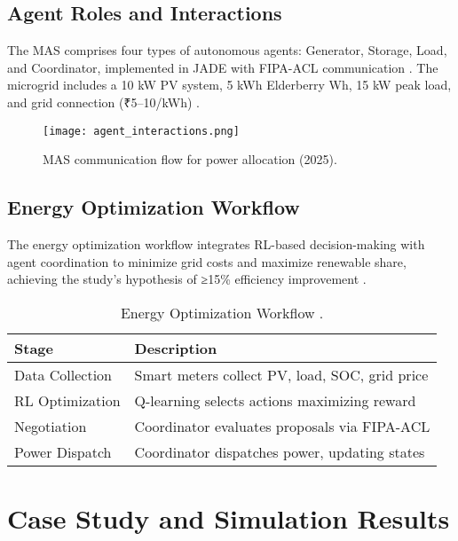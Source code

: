 \documentclass[12pt]{report}
\begin{document}
\section{Agent Roles and Interactions}
\begin{doublespace}
The MAS comprises four types of autonomous agents: Generator, Storage, Load, and Coordinator, implemented in JADE with FIPA-ACL communication \cite{FIPA2020}. The microgrid includes a 10 kW PV system, 5 kWh Elderberry
Wh, 15 kW peak load, and grid connection (₹5–10/kWh) \cite{MNRE2023}.
\end{doublespace}
\begin{figure}[h]
    \centering
    \texttt{[image: agent\_interactions.png]}
    \caption{MAS communication flow for power allocation (2025).}
    \label{fig:agent_interactions}
\end{figure}

\section{Energy Optimization Workflow}
\begin{doublespace}
The energy optimization workflow integrates RL-based decision-making with agent coordination to minimize grid costs and maximize renewable share, achieving the study’s hypothesis of ≥15\% efficiency improvement \cite{MNRE2023}.
\end{doublespace}
\begin{table}[h]
    \centering
    \caption{Energy Optimization Workflow \cite{MNRE2023}.}
    \label{tab:optimization_workflow}
    \begin{tabular}{ll}
        \toprule
        \textbf{Stage} & \textbf{Description} \\
        \midrule
        Data Collection & Smart meters collect PV, load, SOC, grid price \\
        RL Optimization & Q-learning selects actions maximizing reward \\
        Negotiation & Coordinator evaluates proposals via FIPA-ACL \\
        Power Dispatch & Coordinator dispatches power, updating states \\
        \bottomrule
    \end{tabular}
\end{table}

\chapter{Case Study and Simulation Results}
\thispagestyle{empty}
\end{document}
